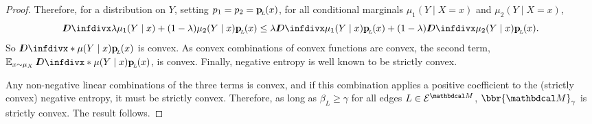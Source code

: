 \begin{proof}
	Therefore, for a distribution on $Y$, setting $p_1 =
 p_2 = \mathbf{p}_{\!_{L}\!}(x)$, for all conditional marginals $\mu_1(Y \mid X=x)$ and
			$\mu_2(Y\mid X=x)$,
	\[ \kldiv{\lambda \mu_1(Y\mid x) + (1-\lambda)
			  \mu_2(Y\mid x) }{ \bp(x) } \leq \lambda \kldiv
			   {\mu_1(Y\mid x)}{\bp(x)} + (1-\lambda)
								  \kldiv{\mu_2(Y\mid x)}{\bp(x)}. \] 
	So $\kldiv*{\mu(Y\mid x)}{\bp( x)}$ is convex. As
			convex combinations of convex functions are convex,
			the second term, $\E_{x\sim\mu_X}\kldiv*{\mu(Y\mid
			  x)}{\bp( x)}$, is convex.
Finally, negative entropy is well known to be strictly convex.                

			Any non-negative linear combinations of the three
			terms is convex, and if this combination applies a
			positive coefficient to the (strictly convex) negative entropy,
			it must be strictly convex. Therefore, as
			long as $\beta_L \geq \gamma$ for all edges $L \in
			\Ed^{\dg M}$, $\bbr{\dg M}_\gamma$ is
strictly convex.  The result follows.
\end{proof}


